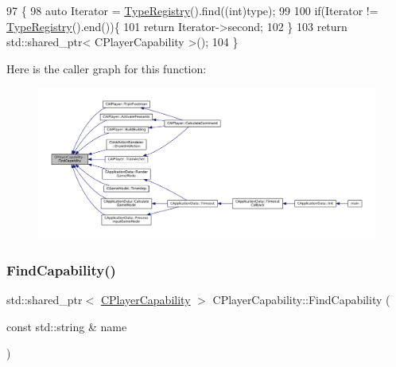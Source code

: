 \begin{DoxyCode}
97                                                                                              \{
98     \textcolor{keyword}{auto} Iterator = \hyperlink{classCPlayerCapability_ab7fee932703792663278b1b2128f00f3}{TypeRegistry}().find((\textcolor{keywordtype}{int})type);
99     
100     \textcolor{keywordflow}{if}(Iterator != \hyperlink{classCPlayerCapability_ab7fee932703792663278b1b2128f00f3}{TypeRegistry}().end())\{
101         \textcolor{keywordflow}{return} Iterator->second;   
102     \}
103     \textcolor{keywordflow}{return} std::shared\_ptr< CPlayerCapability >();
104 \}
\end{DoxyCode}
Here is the caller graph for this function\+:\nopagebreak
\begin{figure}[H]
\begin{center}
\leavevmode
\includegraphics[width=350pt]{classCPlayerCapability_a881ba4b87385d7cfe5cb6ced2d26f226_icgraph}
\end{center}
\end{figure}
\hypertarget{classCPlayerCapability_aca2e1bf2f3dfdced2ff12f922aa52a30}{}\label{classCPlayerCapability_aca2e1bf2f3dfdced2ff12f922aa52a30} 
\subsubsection{\texorpdfstring{Find\+Capability()}{FindCapability()}\hspace{0.1cm}{\footnotesize\ttfamily [2/2]}}
{\footnotesize\ttfamily std\+::shared\+\_\+ptr$<$ \hyperlink{classCPlayerCapability}{C\+Player\+Capability} $>$ C\+Player\+Capability\+::\+Find\+Capability (\begin{DoxyParamCaption}\item[{const std\+::string \&}]{name }\end{DoxyParamCaption})\hspace{0.3cm}{\ttfamily [static]}}



